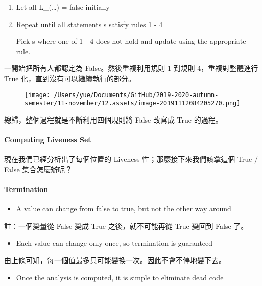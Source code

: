 \documentclass[
]{article}
\begin{document}
\begin{enumerate}
\def\labelenumi{\arabic{enumi}.}
\item
  Let all L\_(\ldots) = false initially
\item
  Repeat until all statements s satisfy rules 1 - 4

  Pick s where one of 1 - 4 does not hold and update using the
  appropriate rule.
\end{enumerate}

一開始把所有人都認定為 False。然後重複利用規則 1 到規則
4，重複對整體進行 True 化，直到沒有可以繼續執行的部分。

\begin{figure}
\centering
\texttt{[image: /Users/yue/Documents/GitHub/2019-2020-autumn-semester/11-november/12.assets/image-20191112084205270.png]}
\caption{}
\end{figure}

總歸，整個過程就是不斷利用四個規則將 False 改寫成 True 的過程。

\hypertarget{header-n80}{%
\paragraph{Computing Liveness Set}\label{header-n80}}

現在我們已經分析出了每個位置的 Liveness 性；那麼接下來我們該拿這個 True
/ False 集合怎麼辦呢？

\hypertarget{header-n82}{%
\paragraph{Termination}\label{header-n82}}

\begin{itemize}
\item
  A value can change from false to true, but not the other way around
\end{itemize}

註：一個變量從 False 變成 True 之後，就不可能再從 True 變回到 False 了。

\begin{itemize}
\item
  Each value can change only once, so termination is guaranteed
\end{itemize}

由上條可知，每一個值最多只可能變換一次。因此不會不停地變下去。

\begin{itemize}
\item
  Once the analysis is computed, it is simple to eliminate dead code
\end{itemize}
\end{document}

